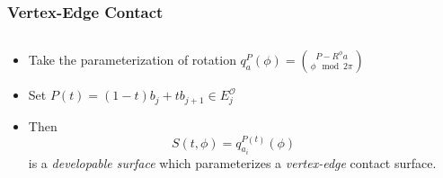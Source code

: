 \documentclass[ucs,9pt,pagenumbers]{beamer}
\begin{document}
\begin{frame}
  \frametitle{Vertex-Edge Contact}
  \begin{columns}[c]
    \begin{column}{0.5\textwidth}
      \begin{minipage}[c][\textheight]{\columnwidth}
        \begin{itemize}
        \item<1-> Take the parameterization of rotation \(q^P_a(\phi) = \binom{P-R^{\phi} a}{\phi \mod 2\pi}\)
        \item<2-> Set \(P(t) = (1-t) b_j + t b_{j+1} \in E^{\mathcal{O}}_j\)
        \item<3-> Then%
          \[S(t,\phi)  = q ^{P(t)}_{a_i}(\phi)\]%
          is a \emph{developable surface} which parameterizes a \emph{vertex-edge} contact surface.
        \end{itemize}
      \end{minipage}
  \end{column}
  \begin{column}{0.45\textwidth}
    \begin{minipage}[c][\textheight]{\columnwidth}
      \centering
    \end{minipage}
  \end{column}
\end{columns}
\end{frame}
\end{document}
